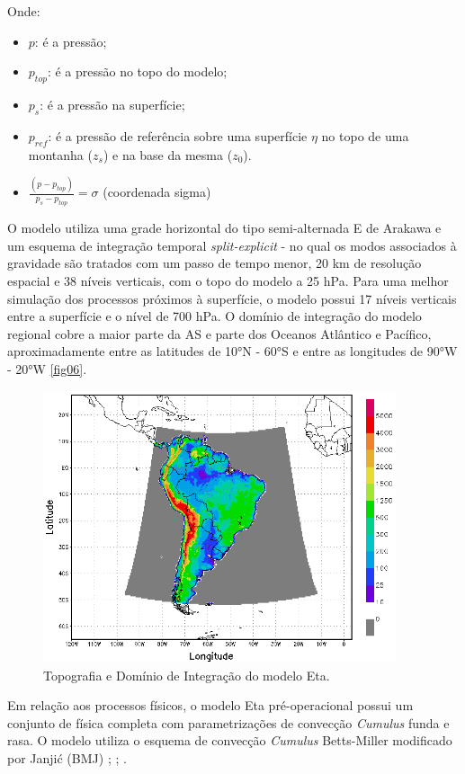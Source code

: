 Onde:

\begin{itemize}
\item $p$: é a pressão;
\item $p_{top}$: é a pressão no topo do modelo;
\item $p_{s}$: é a pressão na superfície;
\item $p_{ref}$: é a pressão de referência sobre uma superfície $\eta$ no topo de uma montanha ($z_{s}$) e na base da mesma ($z_{0}$).
\item $\frac{(p-p_{top})}{p_{s}-p_{top}}=\sigma$ (coordenada sigma)
\end{itemize}

O modelo utiliza uma grade horizontal do tipo semi-alternada E de Arakawa \cite{arakawalamb77} e um esquema de integração temporal \textit{split-explicit} - no qual os modos associados à gravidade são tratados com um passo de tempo menor, 20 km de resolução espacial e 38 níveis verticais, com o topo do modelo a 25 hPa. Para uma melhor simulação dos processos próximos à superfície, o modelo possui 17 níveis verticais entre a superfície e o nível de 700 hPa. O domínio de integração do modelo regional cobre a maior parte da AS e parte dos Oceanos Atlântico e Pacífico, aproximadamente entre as latitudes de 10°N - 60°S e entre as longitudes de 90°W - 20°W \autoref{fig06}.

\begin{figure}[!hpb]
\centering
\includegraphics[height=8cm]{./figs/topo_dom.png}
\caption{Topografia e Domínio de Integração do modelo Eta.}
\label{fig06}
\end{figure}

Em relação aos processos físicos, o modelo Eta pré-operacional possui um conjunto de física completa com parametrizações de convecção \textit{Cumulus} funda e rasa. O modelo utiliza o esquema de convecção \textit{Cumulus} Betts-Miller modificado por Janjić (BMJ) \cite{betts86}; \cite{bettsmiller86}; \cite{janjic94}.


